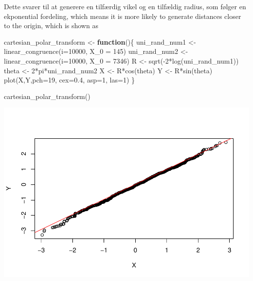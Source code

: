 \documentclass[
]{article}
\newenvironment{Shaded}{\begin{snugshade}}{\end{snugshade}}
\newcommand{\AttributeTok}[1]{\textcolor[rgb]{0.77,0.63,0.00}{#1}}
\newcommand{\ControlFlowTok}[1]{\textcolor[rgb]{0.13,0.29,0.53}{\textbf{#1}}}
\newcommand{\DecValTok}[1]{\textcolor[rgb]{0.00,0.00,0.81}{#1}}
\newcommand{\FloatTok}[1]{\textcolor[rgb]{0.00,0.00,0.81}{#1}}
\newcommand{\FunctionTok}[1]{\textcolor[rgb]{0.00,0.00,0.00}{#1}}
\newcommand{\NormalTok}[1]{#1}
\newcommand{\OtherTok}[1]{\textcolor[rgb]{0.56,0.35,0.01}{#1}}
\newcommand{\SpecialCharTok}[1]{\textcolor[rgb]{0.00,0.00,0.00}{#1}}
\begin{document}
Dette svarer til at generere en tilfærdig vikel og en tilfældig radius,
som følger en ekponential fordeling, which means it is more likely to
generate distances closer to the origin, which is shown as

\begin{Shaded}
\begin{Highlighting}[]
\NormalTok{cartesian\_polar\_transform }\OtherTok{\textless{}{-}} \ControlFlowTok{function}\NormalTok{()\{}
\NormalTok{  uni\_rand\_num1 }\OtherTok{\textless{}{-}} \FunctionTok{linear\_congruence}\NormalTok{(}\AttributeTok{i=}\DecValTok{10000}\NormalTok{, }\AttributeTok{X\_0 =} \DecValTok{145}\NormalTok{)}
\NormalTok{  uni\_rand\_num2 }\OtherTok{\textless{}{-}} \FunctionTok{linear\_congruence}\NormalTok{(}\AttributeTok{i=}\DecValTok{10000}\NormalTok{, }\AttributeTok{X\_0 =} \DecValTok{7346}\NormalTok{)}
\NormalTok{  R }\OtherTok{\textless{}{-}} \FunctionTok{sqrt}\NormalTok{(}\SpecialCharTok{{-}}\DecValTok{2}\SpecialCharTok{*}\FunctionTok{log}\NormalTok{(uni\_rand\_num1))}
\NormalTok{  theta }\OtherTok{\textless{}{-}} \DecValTok{2}\SpecialCharTok{*}\NormalTok{pi}\SpecialCharTok{*}\NormalTok{uni\_rand\_num2}
\NormalTok{  X }\OtherTok{\textless{}{-}}\NormalTok{ R}\SpecialCharTok{*}\FunctionTok{cos}\NormalTok{(theta)}
\NormalTok{  Y }\OtherTok{\textless{}{-}}\NormalTok{ R}\SpecialCharTok{*}\FunctionTok{sin}\NormalTok{(theta)}
  \FunctionTok{plot}\NormalTok{(X,Y,}\AttributeTok{pch=}\DecValTok{19}\NormalTok{, }\AttributeTok{cex=}\FloatTok{0.4}\NormalTok{, }\AttributeTok{asp=}\DecValTok{1}\NormalTok{, }\AttributeTok{las=}\DecValTok{1}\NormalTok{)}
\NormalTok{\}}

\FunctionTok{cartesian\_polar\_transform}\NormalTok{()}
\end{Highlighting}
\end{Shaded}

\includegraphics{TP2_files/figure-latex/unnamed-chunk-5-1.pdf}
\end{document}
